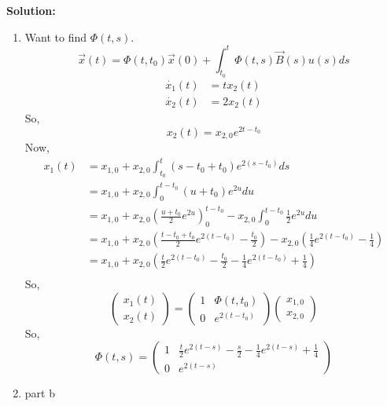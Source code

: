 \documentclass[12pt]{article}
\newenvironment{solution}{
    \textbf{Solution:}
    
}{
    
    \vspace{2em}
}
\begin{document}
\begin{solution}
    \begin{enumerate}[label=\alph*)]
        \item Want to find \(\Phi(t,s)\).
        \[
            \vec{x}(t) = \Phi(t,t_0)\vec{x}(0) + \int_{t_0}^t \Phi(t,s)\vec{B}(s)u(s)ds
        \]
        \[
            \begin{aligned}
                \dot{x_1}(t) &= tx_2(t) \\
                \dot{x_2}(t) &= 2x_2(t)
            \end{aligned}
        \]
        So,
        \[
            x_2(t) = x_{2,0}e^{2t-t_0}
        \]
        Now,
        \[
            \begin{aligned}
                x_1(t) &= x_{1,0} + x_{2,0} \int_{t_0}^t (s-t_0+t_0) e^{2(s-t_0)} ds \\
                &=x_{1,0} + x_{2,0} \int_{0}^{t-t_0} (u+t_0) e^{2u} du \\
                &= x_{1,0} + x_{2,0} \left(\frac{u+t_0}{2}e^{2u} \right)_{0}^{t-t_0} - x_{2,0} \int_{0}^{t-t_0} \frac{1}{2}e^{2u} du \\
                &= x_{1,0} + x_{2,0} \left(\frac{t-t_0+t_0}{2}e^{2(t-t_0)} - \frac{t_0}{2} \right) - x_{2,0} \left( \frac{1}{4}e^{2(t-t_0)} - \frac{1}{4} \right) \\
                &= x_{1,0} + x_{2,0} \left(\frac{t}{2}e^{2(t-t_0)} - \frac{t_0}{2} - \frac{1}{4}e^{2(t-t_0)} + \frac{1}{4} \right) \\
            \end{aligned}
        \]
        So,
        \[
            \begin{pmatrix}
                x_1(t) \\
                x_2(t)
            \end{pmatrix} = \begin{pmatrix}
                1 & \Phi(t,t_0) \\
                0 & e^{2(t-t_0)}
            \end{pmatrix} \begin{pmatrix}
                x_{1,0} \\
                x_{2,0}
            \end{pmatrix}
        \]
        So,
        \[
            \Phi(t,s) = \begin{pmatrix}
                1 & \frac{t}{2}e^{2(t-s)} - \frac{s}{2} - \frac{1}{4}e^{2(t-s)} + \frac{1}{4} \\
                0 & e^{2(t-s)}
            \end{pmatrix}
        \]
        \item part b
        

\end{enumerate}
\end{solution}
\end{document}
